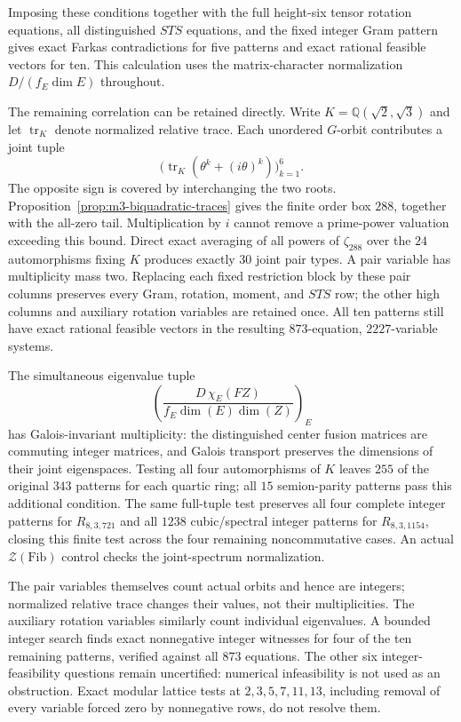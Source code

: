 Imposing these conditions together with the full height-six tensor
rotation equations, all distinguished $STS$ equations, and the fixed
integer Gram pattern gives exact Farkas contradictions for five patterns
and exact rational feasible vectors for ten. This calculation uses the
matrix-character normalization $D/(f_E\dim E)$ throughout.

The remaining correlation can be retained directly. Write
$K=\mathbb Q(\sqrt2,\sqrt3)$ and let $\operatorname{tr}_K$ denote normalized
relative trace. Each unordered $G$-orbit contributes a joint tuple
\[
 \bigl(\operatorname{tr}_K(\theta^k+(i\theta)^k)\bigr)_{k=1}^{6}.
\]
The opposite sign is covered by interchanging the two roots.
Proposition~\ref{prop:m3-biquadratic-traces} gives the finite order box
$288$, together with the all-zero tail. Multiplication by $i$ cannot
remove a prime-power valuation exceeding this bound. Direct exact
averaging of all powers of $\zeta_{288}$ over the $24$ automorphisms fixing
$K$ produces exactly $30$ joint pair types. A pair variable has
multiplicity mass two. Replacing each fixed restriction block by these
pair columns preserves every Gram, rotation, moment, and $STS$ row;
the other high columns and auxiliary rotation variables are retained once.
All ten patterns still have exact rational feasible vectors in the
resulting $873$-equation, $2227$-variable systems.

The simultaneous eigenvalue tuple
\[
 \left(\frac{D\,\chi_E(FZ)}{f_E\dim(E)\dim(Z)}\right)_E
\]
has Galois-invariant multiplicity: the distinguished center fusion
matrices are commuting integer matrices, and Galois transport preserves
the dimensions of their joint eigenspaces. Testing all four automorphisms
of $K$ leaves $255$ of the original $343$ patterns for each quartic ring;
all $15$ semion-parity patterns pass this additional condition.
The same full-tuple test preserves all four complete integer patterns for
$R_{8,3,721}$ and all $1238$ cubic/spectral integer patterns for
$R_{8,3,1154}$, closing this finite test across the four remaining
noncommutative cases. An actual
$\mathcal Z(\mathrm{Fib})$ control checks the joint-spectrum normalization.

The pair variables themselves count actual orbits and hence are integers;
normalized relative trace changes their values, not their multiplicities.
The auxiliary rotation variables similarly count individual eigenvalues.
A bounded integer search finds exact nonnegative integer witnesses for
four of the ten remaining patterns, verified against all $873$ equations.
The other six integer-feasibility questions remain uncertified: numerical
infeasibility is not used as an obstruction. Exact modular lattice tests
at $2,3,5,7,11,13$, including removal of every variable forced zero by
nonnegative rows, do not resolve them.

